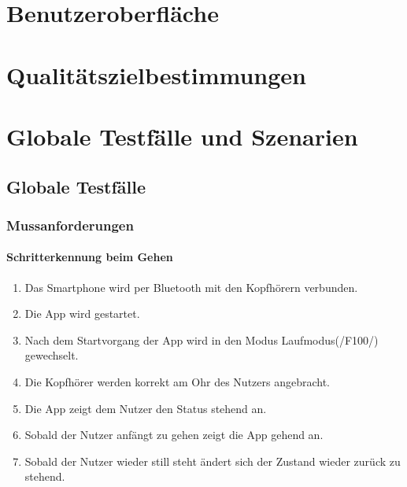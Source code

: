 \documentclass[a4paper,12pt]{article}
\begin{document}
\section{Benutzeroberfläche}
\section{Qualitätszielbestimmungen}
\section{Globale Testfälle und Szenarien}
  \subsection{Globale Testfälle}
  \subsubsection{Mussanforderungen}
  \paragraph{Schritterkennung beim Gehen}%
  \begin{enumerate}
    \item Das Smartphone wird per Bluetooth mit den Kopfhörern verbunden.
    \item Die App wird gestartet.
    \item Nach dem Startvorgang der App wird in den Modus \glqq Laufmodus\grqq{}(/F100/) gewechselt.
    \item Die Kopfhörer werden korrekt am Ohr des Nutzers angebracht.
    \item Die App zeigt dem Nutzer den Status \glqq stehend\grqq{} an.
    \item Sobald der Nutzer anfängt zu gehen zeigt die App \glqq gehend\grqq{} an.
    \item Sobald der Nutzer wieder still steht ändert sich der Zustand wieder zurück zu \glqq stehend\grqq. 
  \end{enumerate}
\end{document}
